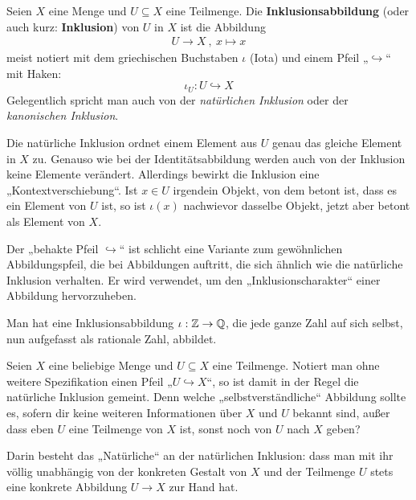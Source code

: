 \begin{defin}[Inklusionsabbildung] \label{def:inklusion} 
    Seien $X$ eine Menge und $U\subseteq X$ eine Teilmenge. Die \textbf{Inklusionsabbildung} (oder auch kurz: \textbf{Inklusion}) von $U$ in $X$ ist die Abbildung
    \begin{align*}
        U \to X \ ,\ x \mapsto x
    \end{align*}
    meist notiert mit dem griechischen Buchstaben $\iota$ (Iota) und einem Pfeil „$\hookrightarrow$“ mit Haken:
        \[ \iota_U : U \hookrightarrow X \]
    Gelegentlich spricht man auch von der \emph{natürlichen Inklusion} oder der \emph{kanonischen Inklusion}.
\end{defin}


\begin{bem}
    Die natürliche Inklusion ordnet einem Element aus $U$ genau das gleiche Element in $X$ zu. Genauso wie bei der Identitätsabbildung werden auch von der Inklusion keine Elemente verändert. Allerdings bewirkt die Inklusion eine „Kontextverschiebung“. Ist $x\in U$ irgendein Objekt, von dem betont ist, dass es ein Element von $U$ ist, so ist $\iota(x)$ nachwievor dasselbe Objekt, jetzt aber betont als Element von $X$.
    
    Der „behakte Pfeil $\hookrightarrow$“ ist schlicht eine Variante zum gewöhnlichen Abbildungspfeil, die bei Abbildungen auftritt, die sich ähnlich wie die natürliche Inklusion verhalten. Er wird verwendet, um den „Inklusionscharakter“ einer Abbildung hervorzuheben. 
\end{bem}


\begin{bsp}
    Man hat eine Inklusionsabbildung $\iota : \mathbb Z \to \mathbb Q$, die jede ganze Zahl auf sich selbst, nun aufgefasst als rationale Zahl, abbildet.
\end{bsp}


\begin{bem}
    Seien $X$ eine beliebige Menge und $U\subseteq X$ eine Teilmenge. Notiert man ohne weitere Spezifikation einen Pfeil „$U\hookrightarrow X$“, so ist damit in der Regel die natürliche Inklusion gemeint. Denn welche „selbstverständliche“ Abbildung sollte es, sofern dir keine weiteren Informationen über $X$ und $U$ bekannt sind, außer dass eben $U$ eine Teilmenge von $X$ ist, sonst noch von $U$ nach $X$ geben?
    
    Darin besteht das „Natürliche“ an der natürlichen Inklusion: dass man mit ihr völlig unabhängig von der konkreten Gestalt von $X$ und der Teilmenge $U$ stets eine konkrete Abbildung $U\to X$ zur Hand hat.
\end{bem}


